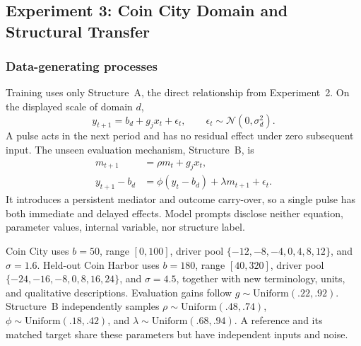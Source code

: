 \subsection{Experiment 3: Coin City Domain and Structural Transfer}
\label{app:exp3-coin-structural}

\subsubsection{Data-generating processes}

Training uses only Structure~A, the direct relationship from Experiment~2. On
the displayed scale of domain $d$,
\begin{equation}
  y_{t+1}=b_d+g_jx_t+\epsilon_t,\qquad
  \epsilon_t\sim\mathcal N(0,\sigma_d^2).
  \label{eq:exp3-coin-a}
\end{equation}
A pulse acts in the next period and has no residual effect under zero subsequent
input. The unseen evaluation mechanism, Structure~B, is
\begin{align}
  m_{t+1}&=\rho m_t+g_jx_t,\\
  y_{t+1}-b_d&=\phi(y_t-b_d)+\lambda m_{t+1}+\epsilon_t.
  \label{eq:exp3-coin-b}
\end{align}
It introduces a persistent mediator and outcome carry-over, so a single pulse has
both immediate and delayed effects. Model prompts disclose neither equation,
parameter values, internal variable, nor structure label.

Coin City uses $b=50$, range $[0,100]$, driver pool
$\{-12,-8,-4,0,4,8,12\}$, and $\sigma=1.6$. Held-out Coin Harbor uses
$b=180$, range $[40,320]$, driver pool
$\{-24,-16,-8,0,8,16,24\}$, and $\sigma=4.5$, together with new terminology,
units, and qualitative descriptions. Evaluation gains follow
$g\sim\mathrm{Uniform}(.22,.92)$. Structure~B independently samples
$\rho\sim\mathrm{Uniform}(.48,.74)$,
$\phi\sim\mathrm{Uniform}(.18,.42)$, and
$\lambda\sim\mathrm{Uniform}(.68,.94)$. A reference and its matched target share
these parameters but have independent inputs and noise.

